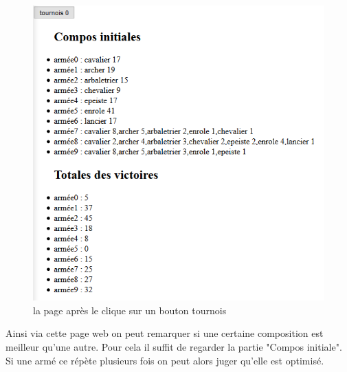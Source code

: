 		\begin{figure}
			\center
			\includegraphics[scale=1]{webimg/but.png}
			\caption{la page après le clique sur un bouton tournois} 
		\end{figure}
		
		Ainsi via cette page web on peut remarquer si une certaine composition est meilleur qu'une autre. Pour cela il suffit de regarder la partie "Compos initiale". Si une armé ce répète plusieurs fois on peut alors juger qu'elle est optimisé.